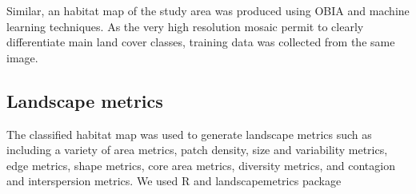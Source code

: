 \documentclass[12pt]{article}
\begin{document}
Similar, an habitat map of the study area was produced using OBIA and machine learning techniques. As the very high resolution mosaic permit to clearly differentiate main land cover classes, training data was collected from the same image. 

\subsection{Landscape metrics}

The classified habitat map was used to generate landscape metrics such as including a variety of area metrics, patch density, size and variability metrics, edge metrics, shape metrics, core area metrics, diversity metrics, and contagion and interspersion metrics. We used \textsf{R} \cite{R_2021} and landscapemetrics package \cite{landscapemetrics_2019} 


\end{document}
